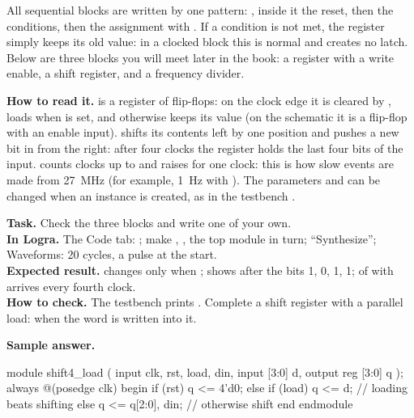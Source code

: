 All sequential blocks are written by one pattern: ,
inside it the reset, then the conditions, then the assignment with \code{<=}.
If a condition is not met, the register simply keeps its old value: in a
clocked block this is normal and creates no latch. Below are three blocks you
will meet later in the book: a register with a write enable, a shift register,
and a frequency divider.


\textbf{How to read it.}  is a register of 
flip-flops: on the clock edge it is cleared by , loads  when
 is set, and otherwise keeps its value (on the schematic it is a
flip-flop with an enable input).  shifts its contents left by one
position and pushes a new bit in from the right: after four clocks the register
holds the last four bits of the input.  counts clocks up to
 and raises  for one clock: this is how slow events are
made from 27~MHz (for example, 1~Hz with ). The parameters
 and  can be changed when an instance is created, as in the
testbench .

\begin{diybox}
\textbf{Task.} Check the three blocks and write one of your own.\\
\textbf{In Logra.} The Code tab: ; make ,
,  the top module in turn; ``Synthesize''; Waveforms:
20 cycles, a  pulse at the start.\\
\textbf{Expected result.}  changes  only when
;  shows  after the bits 1, 0, 1, 1;
 of  with  arrives every fourth clock.\\
\textbf{How to check.} The testbench  prints .
 Complete a shift register with a parallel load: when 
the word  is written into it.
\end{diybox}

\textbf{Sample answer.}\par\nopagebreak
\begin{vcode}
module shift4_load (
    input            clk, rst, load, din,
    input      [3:0] d,
    output reg [3:0] q
);
    always @(posedge clk) begin
        if (rst)       q <= 4'd0;
        else if (load) q <= d;                // loading beats shifting
        else           q <= {q[2:0], din};    // otherwise shift
    end
endmodule
\end{vcode}


